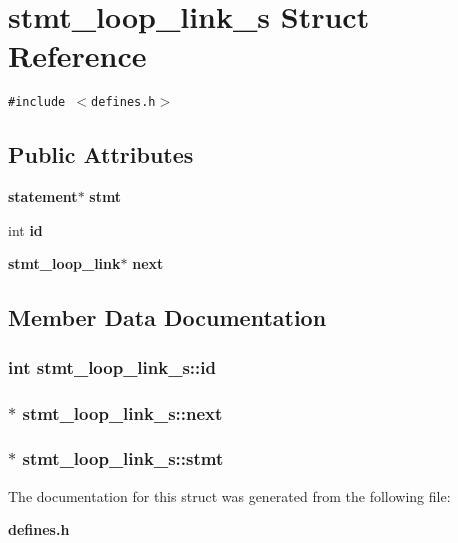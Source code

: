 \section{stmt\_\-loop\_\-link\_\-s  Struct Reference}
\label{structstmt__loop__link__s}
{\tt \#include $<$defines.h$>$}

\subsection*{Public Attributes}
\begin{CompactItemize}
\item 
{\bf statement}$\ast$ {\bf stmt}
\item 
int {\bf id}
\item 
{\bf stmt\_\-loop\_\-link}$\ast$ {\bf next}
\end{CompactItemize}


\subsection{Member Data Documentation}
\subsubsection{\setlength{\rightskip}{0pt plus 5cm}int stmt\_\-loop\_\-link\_\-s::id}\label{structstmt__loop__link__s_m1}


\subsubsection{ $\ast$ stmt\_\-loop\_\-link\_\-s::next}\label{structstmt__loop__link__s_m2}


\subsubsection{ $\ast$ stmt\_\-loop\_\-link\_\-s::stmt}\label{structstmt__loop__link__s_m0}




The documentation for this struct was generated from the following file:\begin{CompactItemize}
\item 
{\bf defines.h}\end{CompactItemize}
